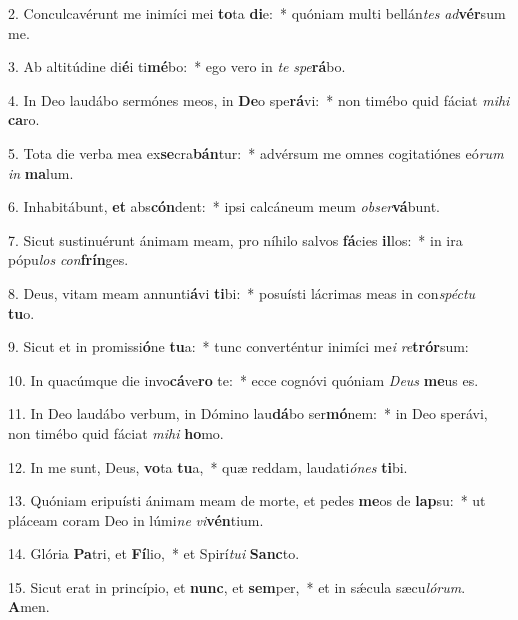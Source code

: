 2. Conculcavérunt me inimíci mei \textbf{to}ta \textbf{di}e:~*  quóniam multi bellán\textit{tes} \textit{ad}\textbf{vér}sum me.\

3. Ab altitúdine di\textbf{é}i ti\textbf{mé}bo:~*  ego vero in \textit{te} \textit{spe}\textbf{rá}bo.\

4. In Deo laudábo sermónes meos, in \textbf{De}o spe\textbf{rá}vi:~*  non timébo quid fáciat \textit{mi}\textit{hi} \textbf{ca}ro.\

5. Tota die verba mea ex\textbf{se}cra\textbf{bán}tur:~*  advérsum me omnes cogitatiónes eó\textit{rum} \textit{in} \textbf{ma}lum.\

6. Inhabitábunt, \textbf{et} abs\textbf{cón}dent:~*  ipsi calcáneum meum \textit{ob}\textit{ser}\textbf{vá}bunt.\

7. Sicut sustinuérunt ánimam meam, pro níhilo salvos \textbf{fá}cies \textbf{il}los:~*  in ira pópu\textit{los} \textit{con}\textbf{frín}ges.\

8. Deus, vitam meam annunti\textbf{á}vi \textbf{ti}bi:~*  posuísti lácrimas meas in con\textit{spéc}\textit{tu} \textbf{tu}o.\

9. Sicut et in promissi\textbf{ó}ne \textbf{tu}a:~*  tunc converténtur inimíci me\textit{i} \textit{re}\textbf{trór}sum:\

10. In quacúmque die invo\textbf{cá}ve\textbf{ro} te:~*  ecce cognóvi quóniam \textit{De}\textit{us} \textbf{me}us es.\

11. In Deo laudábo verbum, in Dómino lau\textbf{dá}bo ser\textbf{mó}nem:~*  in Deo sperávi, non timébo quid fáciat \textit{mi}\textit{hi} \textbf{ho}mo.\

12. In me sunt, Deus, \textbf{vo}ta \textbf{tu}a,~*  quæ reddam, laudati\textit{ó}\textit{nes} \textbf{ti}bi.\

13. Quóniam eripuísti ánimam meam de morte, et pedes \textbf{me}os de \textbf{lap}su:~*  ut pláceam coram Deo in lúmi\textit{ne} \textit{vi}\textbf{vén}tium.\

14. Glória \textbf{Pa}tri, et \textbf{Fí}lio,~*  et Spirí\textit{tu}\textit{i} \textbf{Sanc}to.\

15. Sicut erat in princípio, et \textbf{nunc}, et \textbf{sem}per,~*  et in sǽcula sæcu\textit{ló}\textit{rum}. \textbf{A}men.\

